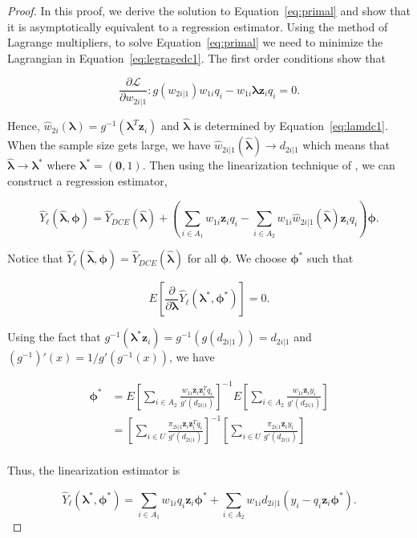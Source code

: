 \documentclass[12pt]{article}
\renewcommand{\bf}[1]{\mathbf{#1}}
\begin{document}
\begin{proof}
  In this proof, we derive the solution to Equation~\ref{eq:primal} and show
  that it is asymptotically equivalent to a regression estimator. Using the
  method of Lagrange multipliers, to solve Equation~\eqref{eq:primal} we need to
  minimize the Lagrangian in Equation~\eqref{eq:legragedc1}. 
  The first order conditions show that

  $$\frac{\partial \mathcal{L}}{\partial w_{2i|1}}: g(w_{2i|1}) w_{1i}q_i -
  w_{1i} \bm \lambda \bf z_i q_i = 0.$$

  Hence, $\hat w_{2i}(\bm \lambda) = g^{-1}(\bm \lambda^T \bf z_i)$ and
  $\hat{\bm \lambda}$ is determined by Equation~\eqref{eq:lamdc1}. When the
  sample size gets large, we have $\hat w_{2i|1}(\hat{\bm \lambda}) \to
  d_{2i|1}$ which means that $\hat{\bm \lambda} \to \bm \lambda^*$ where $\bm
  \lambda^* = (\bf 0, 1)$. Then using the linearization technique of
  \cite{randles1982asymptotic}, we can construct a regression estimator, 

  $$\hat Y_\ell(\hat{\bm \lambda}, \bm \phi)  = \hat Y_{DCE}(\hat{\bm \lambda}) + 
  \left(\sum_{i \in A_1} w_{1i} \bm z_i q_i - \sum_{i \in A_2} w_{1i} 
  \hat w_{2i|1}(\hat{\bm \lambda}) \bf z_i q_i\right)\bm \phi.$$

  Notice that $\hat Y_\ell(\hat{\bm \lambda}, \bm \phi) = \hat Y_{DCE}(\hat{\bm
  \lambda})$ for all $\bm \phi$. We choose $\bm \phi^*$ such that

  $$E\left[\frac{\partial}{\partial \bm \lambda} \hat Y_\ell(\bm \lambda^*,
  \bm \phi^*)\right]=0.$$

  Using the fact that $g^{-1}(\bm \lambda^* \bf z_i) = g^{-1}(g(d_{2i|1})) = d_{2i|1}$
  and $(g^{-1})'(x) = 1 / g'(g^{-1}(x))$, we have

  \begin{align*}
    \bm \phi^*
    &= E\left[\sum_{i \in A_2} \frac{w_{1i}\bf z_i \bf z_i^T q_i}{g'(d_{2i|1})}\right]^{-1}
    E\left[\sum_{i \in A_2} \frac{w_{1i}\bf z_i y_i}{g'(d_{2i|1})}\right]\\
    &= \left[\sum_{i \in U} \frac{\pi_{2i|1} \bf z_i \bf z_i^T q_i}{g'(d_{2i|1})}\right]^{-1}
    \left[\sum_{i \in U} \frac{\pi_{2i|1} \bf z_i y_i}{g'(d_{2i|1})}\right]\\
  \end{align*}

  Thus, the linearization estimator is

  $$\hat Y_\ell(\bm \lambda^*, \bm \phi^*) = 
  \sum_{i \in A_1} w_{1i} q_i \bf z_i \bm \phi^* +
  \sum_{i \in A_2} w_{1i} d_{2i|1} (y_i - q_i \bf z_i \bm \phi^*).$$


\end{proof}
\end{document}
